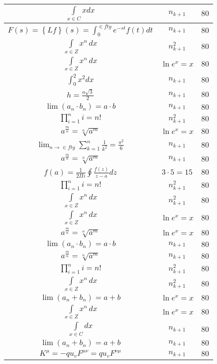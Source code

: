\documentclass{article}
\begin{document}
\begin{flushleft}
\begin{longtable}{|c|c|c|}
$\int \limits_{x\in C}xdx$ & $n_{k+1}$ & $80$ \\ \hline 
$F\left(s\right)=\left\{Lf\right\}\left(s\right)=\int _{0}^{\in fty}e^{-st}f\left(t\right)dt$ & $n_{k+1}$ & $80$ \\ \hline 
$\int \limits_{x\in Z}\!x^{n}\,dx$ & $n_{k+1}^2$ & $80$ \\ \hline 
$\int \limits_{x\in Z}\!x^{n}\,dx$ & $\ln e^x=x$ & $80$ \\ \hline 
$\int _0^2x^2dx$ & $n_{k+1}$ & $80$ \\ \hline 
$h=\frac{a\sqrt{3}}{2}$ & $n_{k+1}$ & $80$ \\ \hline 
$\lim\left(a_n\cdot b_n\right)=a\cdot b$ & $n_{k+1}$ & $80$ \\ \hline 
$\prod_{i=1}^ni=n!$ & $n_{k+1}^2$ & $80$ \\ \hline 
$a^{\frac{m}{n}}=\sqrt[n]{a^{m}}$ & $\ln e^x=x$ & $80$ \\ \hline 
$\lim_{n\to\in fty}\sum_{k=1}^n\frac{1}{k^2}=\frac{\pi^2}{6}$ & $n_{k+1}$ & $80$ \\ \hline 
$a^{\frac{m}{n}}=\sqrt[n]{a^{m}}$ & $n_{k+1}$ & $80$ \\ \hline 
$f\left(a\right)=\frac{1}{2\Pi i}\oint\frac{f\left(z\right)}{z-a}dz$ & $3\cdot 5=15$ & $80$ \\ \hline 
$\prod_{i=1}^ni=n!$ & $n_{k+1}^2$ & $80$ \\ \hline 
$\int \limits_{x\in Z}\!x^{n}\,dx$ & $n_{k+1}^2$ & $80$ \\ \hline 
$\int \limits_{x\in Z}\!x^{n}\,dx$ & $\ln e^x=x$ & $80$ \\ \hline 
$a^{\frac{m}{n}}=\sqrt[n]{a^{m}}$ & $\ln e^x=x$ & $80$ \\ \hline 
$\lim\left(a_n\cdot b_n\right)=a\cdot b$ & $n_{k+1}$ & $80$ \\ \hline 
$a^{\frac{m}{n}}=\sqrt[n]{a^{m}}$ & $n_{k+1}$ & $80$ \\ \hline 
$\prod_{i=1}^ni=n!$ & $n_{k+1}^2$ & $80$ \\ \hline 
$\int \limits_{x\in Z}\!x^{n}\,dx$ & $n_{k+1}^2$ & $80$ \\ \hline 
$\lim\left(a_n+b_n\right)=a+b$ & $\ln e^x=x$ & $80$ \\ \hline 
$\int \limits_{x\in Z}\!x^{n}\,dx$ & $\ln e^x=x$ & $80$ \\ \hline 
$\int \limits_{x\in C}dx$ & $n_{k+1}$ & $80$ \\ \hline 
$\lim\left(a_n+b_n\right)=a+b$ & $n_{k+1}$ & $80$ \\ \hline 
$K^\mu=-qu_vF^{\mu\nu}=qu_vF^{\nu\mu}$ & $n_{k+1}$ & $80$ \\ \hline 

\end{longtable}
\end{flushleft}
\end{document}
